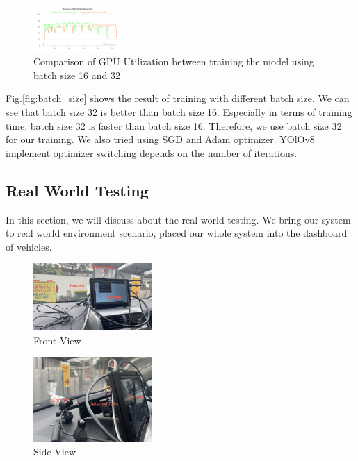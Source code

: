 \documentclass[conference]{IEEEtran}
\begin{document}
\begin{figure}[h!]
\centering
\includegraphics[width=0.3\textwidth,keepaspectratio]{gpu_utilization_comparison.png} 
\caption{Comparison of GPU Utilization between training the model using batch size 16 and 32}
\label{fig:gpu_utilization}
\end{figure}
Fig.\ref{fig:batch_size} shows the result of training with different batch size. We can see that batch size 32 is better than batch size 16. Especially in terms of training time, batch size 32 is faster than batch size 16.
Therefore, we use batch size 32 for our training. We also tried using SGD and Adam optimizer. YOlOv8 implement optimizer switching depends on the number of iterations.




\subsection{Real World Testing}
In this section, we will discuss about the real world testing. We bring our system to real world environment scenario, placed our whole system into the dashboard of vehicles.
\begin{figure}[h!]
    \centering
    \includegraphics[width=0.4\textwidth,keepaspectratio]{mounted_camera_front_view.jpg}
    \caption{Front View}
    \label{fig:front_view}
\end{figure}

\begin{figure}[h!]
    \centering
    \includegraphics[width=0.4\textwidth,keepaspectratio]{mounted_camera_side_view.jpg}
    \caption{Side View}
    \label{fig:side_view}
\end{figure}
\end{document}
